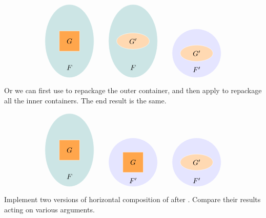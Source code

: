 \documentclass[DaoFP]{subfiles}
\begin{document}
\[
\begin{tikzpicture}
\filldraw[fill=blue!50!green!20, draw=white] (0, 0) ellipse (1.2 and 1.8);
\filldraw[fill=orange!70, draw=white] (-0.5, -0.5) rectangle (0.5, 0.5);
\node at (0, 0) {$G$};
\node at (0, -1.3) {$F$};
\end{tikzpicture}
\hspace{20pt}
\begin{tikzpicture}
\filldraw[fill=blue!50!green!20, draw=white] (0, 0) ellipse (1.2 and 1.8);
\filldraw[fill=orange!30, draw=white] (0, 0) ellipse (0.8 and 0.4);
\node at (0, 0) {$G'$};
\node at (0, -1.3) {$F$};
\end{tikzpicture}
\hspace{20pt}
\begin{tikzpicture}
\filldraw[fill=blue!10, draw=white] (0, 0) circle (1.2);
\filldraw[fill=orange!30, draw=white] (0, 0) ellipse (0.8 and 0.4);
\node at (0, 0) {$G'$};
\node at (0, -0.8) {$F'$};
\end{tikzpicture}
\]


Or we can first use  to repackage the outer container, and then apply  to repackage all the inner containers. The end result is the same.

\[
\begin{tikzpicture}
\filldraw[fill=blue!50!green!20, draw=white] (0, 0) ellipse (1.2 and 1.8);
\filldraw[fill=orange!70, draw=white] (-0.5, -0.5) rectangle (0.5, 0.5);
\node at (0, 0) {$G$};
\node at (0, -1.3) {$F$};
\end{tikzpicture}
\hspace{20pt}
\begin{tikzpicture}
\filldraw[fill=blue!10, draw=white] (0, 0) circle (1.2);
\filldraw[fill=orange!70, draw=white] (-0.5, -0.5) rectangle (0.5, 0.5);
\node at (0, 0) {$G$};
\node at (0, -0.9) {$F'$};
\end{tikzpicture}
\hspace{20pt}
\begin{tikzpicture}
\filldraw[fill=blue!10, draw=white] (0, 0) circle (1.2);
\filldraw[fill=orange!30, draw=white] (0, 0) ellipse (0.8 and 0.4);
\node at (0, 0) {$G'$};
\node at (0, -0.9) {$F'$};
\end{tikzpicture}
\]


\begin{exercise}
Implement two versions of horizontal composition of  after . Compare their results acting on various arguments.
\end{exercise}
\end{document}
